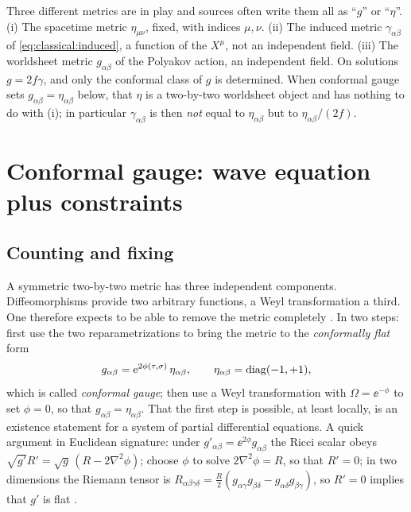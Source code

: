 \begin{pitfallbox}
Three different metrics are in play and sources often write them all as ``$g$'' or
``$\eta$''. (i) The spacetime metric $\eta_{\mu\nu}$, fixed, with indices $\mu,\nu$.
(ii) The induced metric $\gamma_{\alpha\beta}$ of \eqref{eq:classical:induced}, a function of
the $X^\mu$, not an independent field. (iii) The worldsheet metric $g_{\alpha\beta}$ of the
Polyakov action, an independent field. On solutions $g=2f\gamma$, and only the conformal
class of $g$ is determined. When conformal gauge sets $g_{\alpha\beta}=\eta_{\alpha\beta}$
below, that $\eta$ is a two-by-two worldsheet object and has nothing to do with (i); in
particular $\gamma_{\alpha\beta}$ is then \emph{not} equal to $\eta_{\alpha\beta}$ but to
$\eta_{\alpha\beta}/(2f)$.
\end{pitfallbox}

\section{Conformal gauge: wave equation plus constraints}\label{sec:classical:gauge}

\subsection{Counting and fixing}

A symmetric two-by-two metric has three independent components. Diffeomorphisms provide two
arbitrary functions, a Weyl transformation a third. One therefore expects to be able to
remove the metric completely . In two steps: first use
the two reparametrizations to bring the metric to the \emph{conformally flat} form
\begin{equation}\label{eq:classical:confgauge}
  g_{\alpha\beta}=\mathrm{e}^{2\phi(\tau,\sigma)}\,\eta_{\alpha\beta},\qquad \eta_{\alpha\beta}=\operatorname{diag}(-1,+1),
\end{equation}
which is called \emph{conformal gauge}; then use a Weyl transformation
with $\Omega=\ee^{-\phi}$ to set $\phi=0$, so that $g_{\alpha\beta}=\eta_{\alpha\beta}$. That
the first step is possible, at least locally, is an existence statement for a system of
partial differential equations. A quick argument in Euclidean signature: under
$g'_{\alpha\beta}=\ee^{2\phi}g_{\alpha\beta}$ the Ricci scalar obeys
$\sqrt{g'}R'=\sqrt{g}\,(R-2\nabla^2\phi)$; choose $\phi$ to solve $2\nabla^2\phi=R$, so that
$R'=0$; in two dimensions the Riemann tensor is $R_{\alpha\beta\gamma\delta}=\frac R2(g_{\alpha
\gamma}g_{\beta\delta}-g_{\alpha\delta}g_{\beta\gamma})$, so $R'=0$ implies that $g'$ is flat
 \TL.


